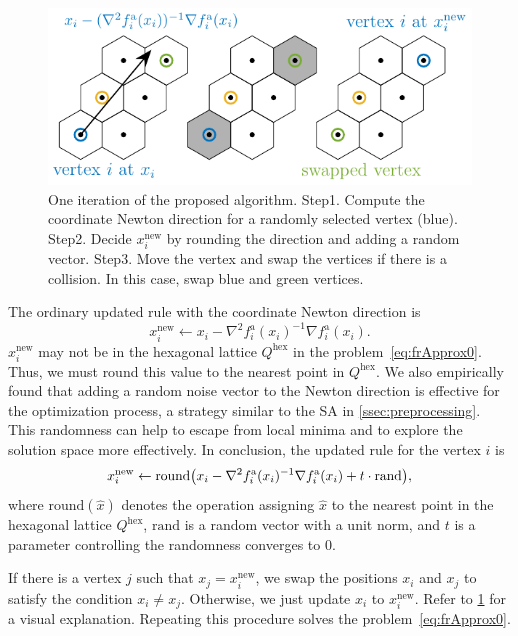 \documentclass[dvipdfmx,10pt,journal,compsoc]{IEEEtran}
\begin{document}
\begin{figure}[t]
  \centering
  \includegraphics[width=\columnwidth]{hex/hex.pdf}
  \caption{One iteration of the proposed algorithm. Step1. Compute the coordinate Newton direction for a randomly selected vertex (blue). Step2. Decide $x_i^\mathrm{new}$ by rounding the direction and adding a random vector. Step3. Move the vertex and swap the vertices if there is a collision. In this case, swap blue and green vertices.}
  \label{fig:hex}
\end{figure}

The ordinary updated rule with the coordinate Newton direction is
\begin{equation*}
  x_i^\mathrm{new} \gets x_i - \nabla^2 f^{\mathrm{a}}_i(x_i)^{-1} \nabla f^{\mathrm{a}}_i(x_i).
\end{equation*}
$x_i^\mathrm{new}$ may not be in the hexagonal lattice $Q^\mathrm{hex}$ in the problem~\eqref{eq:frApprox0}.
Thus, we must round this value to the nearest point in $Q^\mathrm{hex}$.
We also empirically found that adding a random noise vector to the Newton direction is effective for the optimization process, a strategy similar to the SA in \cref{ssec:preprocessing}. This randomness can help to escape from local minima and to explore the solution space more effectively.
In conclusion, the updated rule for the vertex $i$ is
\begin{equation*}
  x_i^\mathrm{new} \gets \mathrm{round}\qty(x_i - \nabla^2 f^{\mathrm{a}}_i(x_i)^{-1} \nabla f^{\mathrm{a}}_i(x_i) + t \cdot \text{rand}),
\end{equation*}
where $\mathrm{round}(\hat{x})$ denotes the operation assigning $\hat{x}$ to the nearest point in the hexagonal lattice $Q^\mathrm{hex}$, $\mathrm{rand}$ is a random vector with a unit norm, and $t$ is a parameter controlling the randomness converges to 0.

If there is a vertex $j$ such that $x_j = x_i^\mathrm{new}$, we swap the positions $x_i$ and $x_j$ to satisfy the condition $x_i \neq x_j$.
Otherwise, we just update $x_i$ to $x_i^\mathrm{new}$. Refer to \cref{fig:hex} for a visual explanation.
Repeating this procedure solves the problem~\eqref{eq:frApprox0}.
\end{document}
